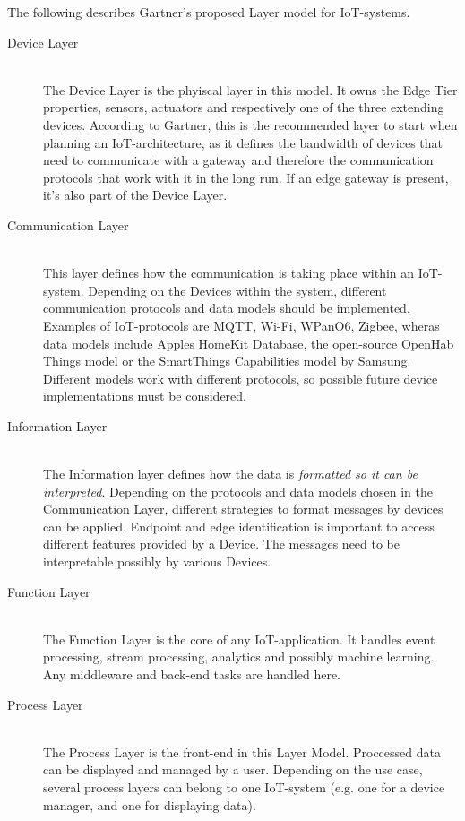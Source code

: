 The following describes Gartner's proposed Layer model for IoT-systems.

\begin{description}
    \item[Device Layer] \hfill \\
    The Device Layer is the phyiscal layer in this model. 
    It owns the Edge Tier properties, sensors, actuators and respectively one of the three extending devices. 
    According to Gartner, this is the recommended layer to start when planning an IoT-architecture, as it defines the bandwidth of devices that need 
    to communicate with a gateway and therefore the communication protocols that work with it in the long run.
    If an edge gateway is present, it's also part of the Device Layer.
    \item[Communication Layer] \hfill \\
    This layer defines how the communication is taking place within an IoT-system.
    Depending on the Devices within the system, different communication protocols and data models should be implemented.
    Examples of IoT-protocols are MQTT, Wi-Fi, WPanO6, Zigbee, 
    wheras data models include Apples HomeKit Database, the open-source OpenHab Things model or the SmartThings Capabilities model by Samsung. 
    Different models work with different protocols, 
    so possible future device implementations must be considered.
    \item[Information Layer]  \hfill \\ 
    The Information layer defines how the data is \textit{formatted so it can be interpreted}.
    Depending on the protocols and data models chosen in the Communication Layer, 
    different strategies to format messages by devices can be applied.
    Endpoint and edge identification is important to access different features provided by a Device.
    The messages need to be interpretable possibly by various Devices.
    \item[Function Layer] \hfill \\ 
    The Function Layer is the core of any IoT-application.
    It handles event processing, stream processing, analytics and possibly machine learning.
    Any middleware and back-end tasks are handled here.
    \item[Process Layer]   \hfill \\
    The Process Layer is the front-end in this Layer Model. Proccessed data can be displayed and managed by a user. 
    Depending on the use case, several process layers can belong to one IoT-system (e.g. one for a device manager, and one for displaying data).
\end{description}

